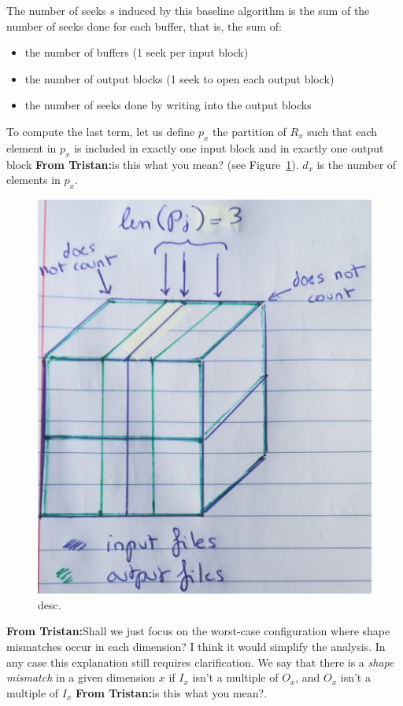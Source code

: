 \documentclass[conference]{IEEEtran}
\newcommand{\tristan}[1]{\color{orange}\textbf{From Tristan:}#1\color{black}}
\begin{document}
The number of seeks $s$ induced by this baseline algorithm is the
sum of the number of seeks done for each buffer, that is, the sum of:
\begin{itemize}
  \item the number of buffers (1 seek per input block)
  \item the number of output blocks (1 seek to open each output block)
  \item the number of seeks done by writing into the output blocks
\end{itemize}
To compute the last term, let us define $p_x$ the partition of $R_x$
such that each element in $p_x$ is included in exactly one input block and in exactly one output block \tristan{is this what you mean?}
(see Figure~\ref{fig:p}). $d_x$ is the number of elements in $p_x$.
\begin{figure}[h]
  \centering
  \includegraphics[scale=0.15]{./figures/new/p.jpeg}
  \caption{desc.}
  \label{fig:p}
  \end{figure}

\tristan{Shall we just focus on the worst-case configuration where shape mismatches occur in each dimension?
I think it would simplify the analysis. In any case this explanation still requires clarification.}
We say that there is a \emph{shape mismatch} in a given dimension $x$ if $I_x$
isn't a multiple of $O_x$, and $O_x$ isn't a multiple of $I_x$ \tristan{is this what you mean?}.
\end{document}
